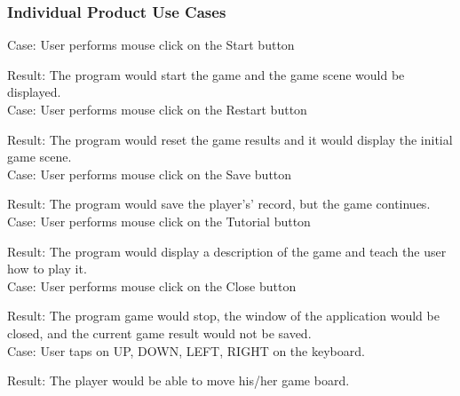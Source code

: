 \documentclass[12pt,letterpaper]{article}
\begin{document}
	\subsubsection{Individual Product Use Cases}
	Case: User performs mouse click on the Start button

Result: The program would start the game and the game scene would be displayed.\\

Case: User performs mouse click on the Restart button

Result: The program would reset the game results and it would display the initial game scene.\\

Case: User performs mouse click on the Save button

Result:  The program would save the player's’ record, but the game continues. \\

Case: User performs mouse click on the Tutorial button

Result: The program would display a description of the game and teach the user how to play it.\\

Case: User performs mouse click on the Close button

Result: The program game would stop, the window of the application would be closed, and the current game result would not be saved.\\

Case: User taps on UP, DOWN, LEFT, RIGHT on the keyboard.

Result: The player would be able to move his/her game board.\\
\end{document}
